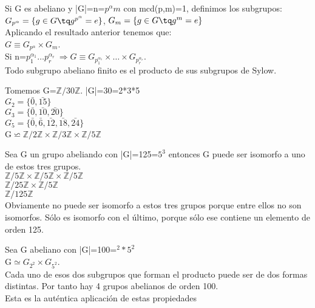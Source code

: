 \documentclass[nochap]{apuntes}
\begin{document}
\begin{example}
 Si G es abeliano y |G|=n=$p^{\alpha}m$  con mcd(p,m)=1, definimos los subgrupos:\\
 $G_{p^{\alpha}}=\{g\in G \tq g^{p^{\alpha}}=e\}$, $G_m=\{g \in G \tq g^{m}=e\}$\\
 Aplicando el resultado anterior tenemos que:\\
 $G\equiv G_{p^{\alpha}} \times G_m$.\\
 Si n=$p_1^{\alpha_1}\dots p_r^{\alpha_r} \ \Rightarrow G\equiv G_{p_1^{\alpha_1}}\times \dots \times G_{p_r^{\alpha_r}}$.\\
 Todo subgrupo abeliano finito es el producto de sus subgrupos de Sylow.
\end{example}

\begin{example}
 Tomemos G=$\mathbb{Z}/30\mathbb{Z}$. |G|=30=2*3*5\\
 $G_2=\{\bar{0}, \bar{15}\}$\\
 $G_3=\{\bar{0}, \bar{10}, \bar{20}\}$\\
 $G_5=\{\bar{0}, \bar{6}, \bar{12}, \bar{18}, \bar{24}\}$\\
 G$\backsimeq \mathbb{Z}/2\mathbb{Z}\times\mathbb{Z}/3\mathbb{Z}\times\mathbb{Z}/5\mathbb{Z}$
\end{example}

\begin{example}
 Sea G un grupo abeliando con |G|=125=$5^{3}$  entonces G puede ser isomorfo a uno de estos tres grupos.\\
 $\mathbb{Z}/5\mathbb{Z}\times \mathbb{Z}/5\mathbb{Z} \times \mathbb{Z}/5\mathbb{Z}$\\
 $\mathbb{Z}/25\mathbb{Z}\times\mathbb{Z}/5\mathbb{Z}$\\
 $\mathbb{Z}/125\mathbb{Z}$\\
 Obviamente no puede ser isomorfo a estos tres grupos porque entre ellos no son isomorfos. Sólo es isomorfo con el último, porque sólo 
 ese contiene un elemento de orden 125.
\end{example}

\begin{example}
 Sea G abeliano con |G|=100=$^{2}*5^{2}$\\
 G$\simeq G_{2^{2}} \times G_{5^{2}}$.\\
 Cada uno de esos dos subgrupos que forman el producto puede ser de dos formas distintas. Por tanto hay 4 grupos abelianos de orden 100.\\
 Esta es la auténtica aplicación de estas propiedades
\end{example}
\newpage
\end{document}
